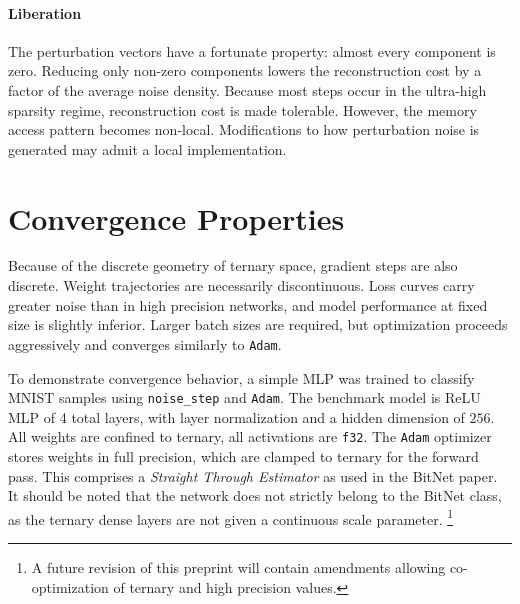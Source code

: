 \documentclass{article}
\begin{document}
\paragraph{Liberation}
The perturbation vectors have a fortunate property: almost every component is zero. 
Reducing only non-zero components lowers the reconstruction cost by a factor of the average noise density.
Because most steps occur in the ultra-high sparsity regime, reconstruction cost is made tolerable.
However, the memory access pattern becomes non-local. Modifications to how perturbation noise is generated may admit a local implementation.

\newpage
\section{Convergence Properties}
Because of the discrete geometry of ternary space, gradient steps are also discrete.
Weight trajectories are necessarily discontinuous. Loss curves carry greater noise than in high precision networks, and model performance at fixed size is slightly inferior. 
Larger batch sizes are required, but optimization proceeds aggressively and converges similarly to \texttt{Adam}.

To demonstrate convergence behavior, a simple MLP was trained to classify MNIST samples using \texttt{noise\_step} and \texttt{Adam}.
The benchmark model is ReLU MLP of 4 total layers, with layer normalization and a hidden dimension of $256$. All weights are confined to ternary, all activations are \texttt{f32}.
The \texttt{Adam} optimizer stores weights in full precision, which are clamped to ternary for the forward pass. 
This comprises a \textit{Straight Through Estimator} as used in the BitNet paper. 
It should be noted that the network does not strictly belong to the BitNet class, as the ternary dense layers are not given a continuous scale parameter. 
\footnote{A future revision of this preprint will contain amendments allowing co-optimization of ternary and high precision values.}
\end{document}
